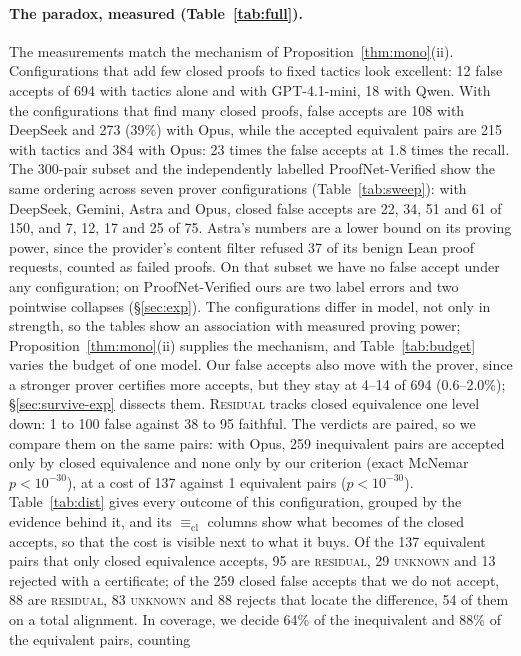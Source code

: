 \documentclass[10pt]{article}
\theoremstyle{definition}
\newcommand{\Ecl}{\mathrel{\equiv_{\mathrm{cl}}}}
\newcommand{\V}[1]{\textsc{#1}}
\begin{document}
\paragraph{The paradox, measured (Table~\ref{tab:full}).} The measurements match the mechanism of
Proposition~\ref{thm:mono}(ii). Configurations that add few closed proofs to fixed tactics look
excellent: 12 false accepts of 694 with tactics alone and with GPT-4.1-mini, 18 with Qwen. With
the configurations that find many closed proofs, false accepts are 108 with DeepSeek and 273
(39\%) with Opus, while the accepted equivalent pairs are 215 with tactics and 384 with Opus: 23
times the false accepts at 1.8 times the recall. The 300-pair subset and the independently
labelled ProofNet-Verified show the same ordering across seven prover configurations
(Table~\ref{tab:sweep}): with DeepSeek, Gemini, Astra and Opus, closed false accepts are 22, 34,
51 and 61 of 150, and 7, 12, 17 and 25 of 75. Astra's numbers are a lower bound on its proving
power, since the provider's content filter refused 37 of its benign Lean proof requests, counted
as failed proofs. On that subset we have no false accept under any configuration; on
ProofNet-Verified ours are two label errors and two pointwise collapses (\S\ref{sec:exp}). The
configurations differ in model, not only in strength, so the tables show an association with
measured proving power; Proposition~\ref{thm:mono}(ii) supplies the mechanism, and
Table~\ref{tab:budget} varies the budget of one model. Our false accepts also move with the
prover, since a stronger prover certifies more accepts, but they stay at 4--14 of 694
(0.6--2.0\%); \S\ref{sec:survive-exp} dissects them. \V{Residual} tracks closed equivalence one
level down: 1 to 100 false against 38 to 95 faithful. The verdicts are paired, so we compare
them on the same pairs: with Opus, 259 inequivalent pairs are accepted only by closed equivalence
and none only by our criterion (exact McNemar $p<10^{-30}$), at a cost of 137 against 1
equivalent pairs ($p<10^{-30}$). Table~\ref{tab:dist} gives every outcome of this
configuration, grouped by the evidence behind it, and its $\Ecl$ columns show what becomes of the
closed accepts, so that the cost is visible next to what it buys. Of the 137 equivalent pairs
that only closed equivalence accepts, 95 are \V{residual}, 29 \V{unknown} and 13 rejected with a
certificate; of the 259 closed false accepts that we do not accept, 88 are \V{residual}, 83
\V{unknown} and 88 rejects that locate the difference, 54 of them on a total alignment. In
coverage, we decide 64\% of the inequivalent and 88\% of the equivalent pairs, counting
\end{document}
